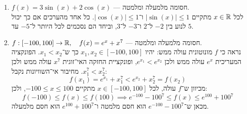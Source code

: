 \begin{enumerate}
	\item $f(x) = 3\sin(x) + 2\cos(x)$ --- חסומה מלמעלה ומלמטה. \\
		לכל $x \in \mathbb{R}$ מתקיים $|\sin(x)| \le 1$ ו־$|\cos(x)| \le 1$. כל אחד מהערכים אם כך יכול לנוע בין $-2$ ל־$2$ ו־$-3$ ל־$3$, וביחד הם נסכמים לכל היותר ל־$-5$ עד $5$.

	\item $f : [-100, 100] \to \mathbb{R}, \quad f(x) = e^x + x^7$ --- חסומה מלמעלה ומלמטה. \\
		נראה כי $f$ מונוטונית עולה ממש: יהיו $x_1, x_2 \in [-100, 100]$ כך ש־$x_1 < x_2$. הפונקציה המעריכית $e^x$ עולה ממש ולכן $e^{x_1} < e^{x_2}$, ופונקציית החזקה האי־זוגית $x^7$ עולה ממש ולכן $x_1^7 < x_2^7$. מחיבור אי־השוויונות נקבל:
		\[
			f(x_1) = e^{x_1} + x_1^7 < e^{x_2} + x_2^7 = f(x_2)
		\]
		מכיוון ש־$f$ עולה, לכל $x \in [-100, 100]$ מתקיים $-100 \le x \le 100$, ולכן:
		\[
			f(-100) \le f(x) \le f(100) \implies e^{-100} - 100^7 \le f(x) \le e^{100} + 100^7
		\]
		מכאן ש־$e^{-100} - 100^7$ הוא חסם מלמטה ו־$e^{100} + 100^7$ הוא חסם מלמעלה.
\end{enumerate}

